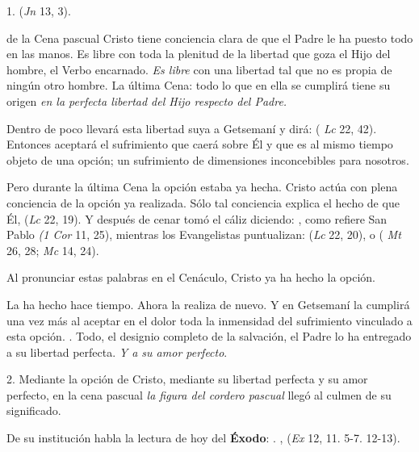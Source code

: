 \begin{body}
1.  (\textit{Jn} 13, 3). 

 de la Cena pascual Cristo tiene conciencia clara de que el Padre le ha puesto todo en las manos. Es libre con toda la plenitud de la libertad que goza el Hijo del hombre, el Verbo encarnado. \textit{Es libre} con una libertad tal que no es propia de ningún otro hombre. La última Cena: todo lo que en ella se cumplirá tiene su origen \textit{en la perfecta libertad del Hijo respecto del Padre.}

Dentro de poco llevará esta libertad suya a Getsemaní y dirá:  ( \textit{Lc} 22, 42). Entonces aceptará el sufrimiento que caerá sobre Él y que es al mismo tiempo objeto de una opción; un sufrimiento de dimensiones inconcebibles para nosotros. 

Pero durante la última Cena la opción estaba ya hecha. Cristo actúa con plena conciencia de la opción ya realizada. Sólo tal conciencia explica el hecho de que Él,  (\textit{Lc} 22, 19). Y después de cenar tomó el cáliz diciendo: , como refiere San Pablo \textit{(1 Cor} 11, 25), mientras los Evangelistas puntualizan:  (\textit{Lc} 22, 20), o  ( \textit{Mt} 26, 28; \textit{Mc} 14, 24). 

Al pronunciar estas palabras en el Cenáculo, Cristo ya ha hecho la opción. 

La ha hecho hace tiempo. Ahora la realiza de nuevo. Y en Getsemaní la cumplirá una vez más al aceptar en el dolor toda la inmensidad del sufrimiento vinculado a esta opción. . Todo, el designio completo de la salvación, el Padre lo ha entregado a su libertad perfecta. \textit{Y a su amor perfecto}.

2. Mediante la opción de Cristo, mediante su libertad perfecta y su amor perfecto, en la cena pascual \textit{la figura del cordero pascual} llegó al culmen de su significado. 

De su institución habla la lectura de hoy del \textbf{Éxodo}: . ,  (\textit{Ex} 12, 11. 5-7. 12-13). 


\end{body}
